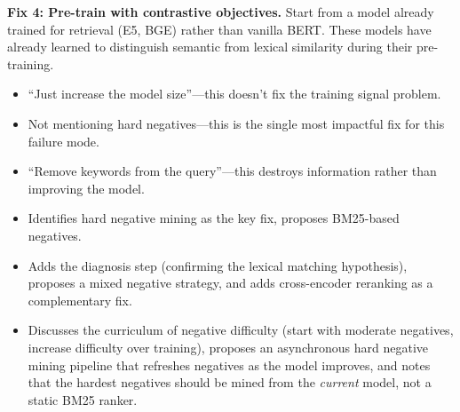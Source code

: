 \begin{interviewq}
\textbf{Fix 4: Pre-train with contrastive objectives.} Start from a model already trained for retrieval (E5, BGE) rather than vanilla BERT. These models have already learned to distinguish semantic from lexical similarity during their pre-training.

\redflags
\begin{itemize}
    \item ``Just increase the model size''---this doesn't fix the training signal problem.
    \item Not mentioning hard negatives---this is the single most impactful fix for this failure mode.
    \item ``Remove keywords from the query''---this destroys information rather than improving the model.
\end{itemize}


\goodgreat
\begin{itemize}
    \item {} Identifies hard negative mining as the key fix, proposes BM25-based negatives.
    \item {} Adds the diagnosis step (confirming the lexical matching hypothesis), proposes a mixed negative strategy, and adds cross-encoder reranking as a complementary fix.
    \item {} Discusses the curriculum of negative difficulty (start with moderate negatives, increase difficulty over training), proposes an asynchronous hard negative mining pipeline that refreshes negatives as the model improves, and notes that the hardest negatives should be mined from the \textit{current} model, not a static BM25 ranker.
\end{itemize}

\end{interviewq}


